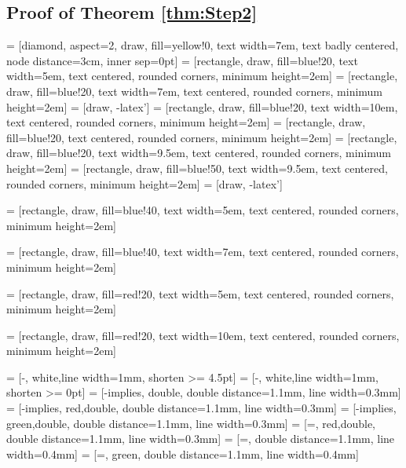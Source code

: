 \documentclass[12pt]{article}
\theoremstyle{remark}
\begin{document}
\subsection{Proof of Theorem \ref{thm:Step2}}
\label{sec:Step2Analysis}



 = [diamond, aspect=2, draw, fill=yellow!0,
text width=7em, text badly centered, node distance=3cm, inner sep=0pt]
 = [rectangle, draw, fill=blue!20,
text width=5em, text centered, rounded corners, minimum height=2em]
 = [rectangle, draw, fill=blue!20,
text width=7em, text centered, rounded corners, minimum height=2em]
 = [draw, -latex']
 = [rectangle, draw, fill=blue!20,
text width=10em, text centered, rounded corners, minimum height=2em]
 = [rectangle, draw, fill=blue!20,
text centered, rounded corners, minimum height=2em]
 = [rectangle, draw, fill=blue!20,
text width=9.5em, text centered, rounded corners, minimum height=2em]
 = [rectangle, draw, fill=blue!50,
text width=9.5em, text centered, rounded corners, minimum height=2em]
 = [draw, -latex']


 = [rectangle, draw, fill=blue!40,
text width=5em, text centered, rounded corners, minimum height=2em]


 = [rectangle, draw, fill=blue!40,
text width=7em, text centered, rounded corners, minimum height=2em]

 = [rectangle, draw, fill=red!20,
text width=5em, text centered, rounded corners, minimum height=2em]

 = [rectangle, draw, fill=red!20,
text width=10em, text centered, rounded corners, minimum height=2em]






\newcommand{\dd}{2cm}
\newcommand{\ddd}{4cm}
\newcommand{\thd}{4cm}
\newcommand{\qut}{3cm}
\newcommand{\oct}{2cm}
\newcommand{\sm}{0.8cm}
\newcommand{\wit}{20pt}


 = [-, white,line width=1mm, shorten >= 4.5pt]
 = [-, white,line width=1mm, shorten >= 0pt]
 = [-{implies}, double, double distance=1.1mm, line width=0.3mm]
 = [-{implies}, red,double, double distance=1.1mm, line width=0.3mm]
 = [-{implies}, green,double, double distance=1.1mm, line width=0.3mm]
 = [=, red,double, double distance=1.1mm, line width=0.3mm]
 = [=,  double distance=1.1mm, line width=0.4mm]
 = [=, green, double distance=1.1mm, line width=0.4mm]
\usetikzlibrary{arrows, shapes.gates.logic.US, calc}
\end{document}
